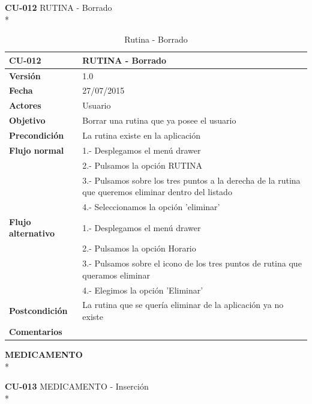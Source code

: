 \documentclass[../pfc.tex]{subfiles}
\begin{document}
	\clearpage
		
	\textbf{CU-012}	RUTINA - Borrado\\*
		
		\begin{table}[H]
			\centering
			\begin{tabular}[t]{|p{3cm}|p{9.5cm}|}
				\hline \textbf{CU-012} & \textbf{RUTINA - Borrado} \\*
				\hline\hline \textbf{Versión} & 1.0 \\*
				\hline\hline \textbf{Fecha} & 27/07/2015 \\*
				\hline\textbf{Actores} 	& Usuario\\*
				\hline \textbf{Objetivo} & Borrar una rutina que ya posee el usuario\\* 			
				\hline \textbf{Precondición} & La rutina existe en la aplicación\\* 
				\hline \textbf{Flujo normal} & 1.- Desplegamos el menú drawer \\* 
				& 2.- Pulsamos la opción RUTINA\\*	
				& 3.- Pulsamos sobre los tres puntos a la derecha de la rutina que queremos eliminar dentro del listado\\*	
				& 4.- Seleccionamos la opción 'eliminar'\\*	
				\hline \textbf{Flujo alternativo} & 1.- Desplegamos el menú drawer \\* 
				& 2.- Pulsamos la opción Horario \\*	
				& 3.- Pulsamos sobre el icono de los tres puntos de rutina que queramos eliminar \\*	
				& 4.- Elegimos la opción 'Eliminar'\\*	
				\hline \textbf{Postcondición} & La rutina que se quería eliminar de la aplicación ya no existe \\* 
				\hline \textbf{Comentarios}   & \\*
				\hline
			\end{tabular}
			\caption{Rutina - Borrado}
			\label{tabla:caso012}
		\end{table}
		
		\clearpage
		
		\textbf{MEDICAMENTO}\\*
		
		\textbf{CU-013}	MEDICAMENTO - Inserción\\*
		
\end{document}
